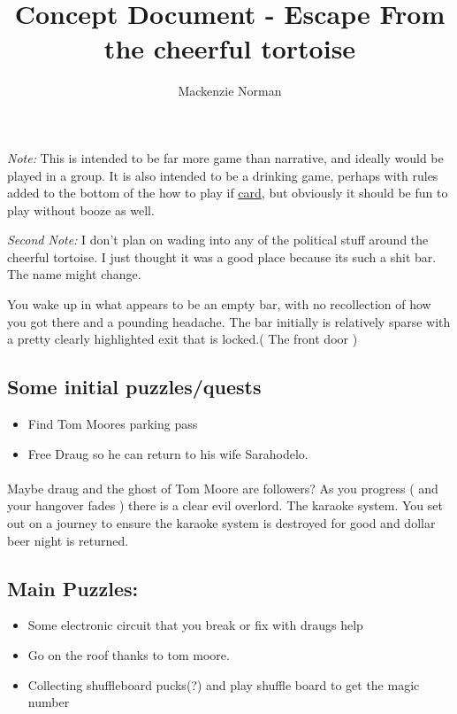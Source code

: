 \documentclass{article}
\title{Concept Document - Escape From the cheerful tortoise}
\author{Mackenzie Norman}
\begin{document}
\maketitle
\textit{Note: }This is intended to be far more game than narrative, and ideally would be played in a group. It is also intended to be a drinking game, perhaps with rules added to the bottom of the how to play if \href{https://pr-if.org/doc/play-if-card/play-if-card.pdf}{card}, but obviously it should be fun to play without booze as well. 

\textit{Second Note: } I don't plan on wading into any of the political stuff around the cheerful tortoise. I just thought it was a good place because its such a shit bar. The name might change.

You wake up in what appears to be an empty bar, with no recollection of how you got there and a pounding headache. The bar initially is relatively sparse with a pretty clearly highlighted exit that is locked.( The front door )

\subsection*{Some initial puzzles/quests}
\begin{itemize} 
    \item  Find Tom Moores parking pass
    \item Free Draug so he can return to his wife Sarahodelo.
\end{itemize}

\paragraph{}
Maybe draug and the ghost of Tom Moore are followers?
As you progress ( and your hangover fades ) there is a clear evil overlord. The karaoke system. You set out on a journey to ensure the karaoke system is destroyed for good and dollar beer night is returned. 

\subsection*{Main Puzzles:}
\begin{itemize}
    \item Some electronic circuit that you break or fix with draugs help

    \item Go on the roof thanks to tom moore. 

    \item Collecting shuffleboard pucks(?) and play shuffle board to get the magic number

\end{itemize}
\end{document}
